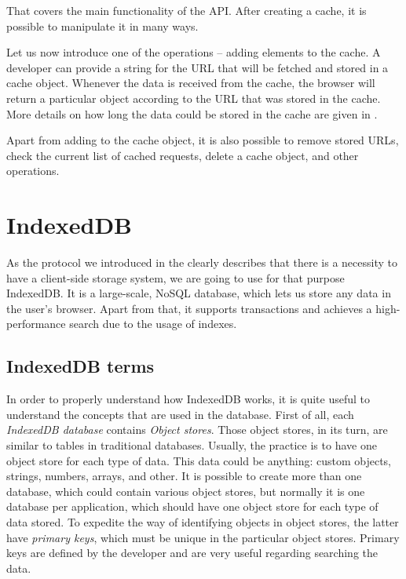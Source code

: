 That covers the main functionality of the API. After creating a cache, it is possible to manipulate it in many ways. 

Let us now introduce one of the operations -- adding elements to the cache. A developer can provide a string for the URL that will be fetched and stored in a cache object. Whenever the data is received from the cache, the browser will return a particular object according to the URL that was stored in the cache. More details on how long the data could be stored in the cache are given in .

Apart from adding to the cache object, it is also possible to remove stored URLs, check the current list of cached requests, delete a cache object, and other operations. 

\section{IndexedDB}
\label{IndexedDB}

As the protocol we introduced in the  clearly describes that there is a necessity to have a client-side storage system, we are going to use for that purpose IndexedDB\cite{35}. It is a large-scale, NoSQL database, which lets us store any data in the user's browser. Apart from that, it supports transactions and achieves a high-performance search due to the usage of indexes. 

\subsection{IndexedDB terms}

In order to properly understand how IndexedDB works, it is quite useful to understand the concepts that are used in the database. First of all, each \textit{IndexedDB database} contains \textit{Object stores}. Those object stores, in its turn, are similar to tables in traditional databases. Usually, the practice is to have one object store for each type of data. This data could be anything: custom objects, strings, numbers, arrays, and other. It is possible to create more than one database, which could contain various object stores, but normally it is one database per application, which should have one object store for each type of data stored. To expedite the way of identifying objects in object stores, the latter have \textit{primary keys}, which must be unique in the particular object stores. Primary keys are defined by the developer and are very useful regarding searching the data.

